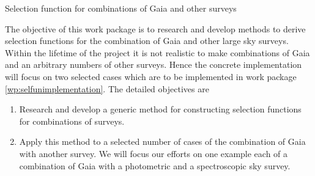 \begin{workpackage}{Selection function for combinations of Gaia and other surveys}
  \label{wp:selfuncombine}
  \wpend{\duration} %

  \makewptable %

  \begin{wpobjectives}
    The objective of this work package is to research and develop methods to derive selection functions for the combination of Gaia and other large sky surveys. Within the lifetime of the project it is not realistic to make combinations of Gaia and an arbitrary numbers of other surveys. Hence the concrete implementation will focus on two selected cases which are to be implemented in work package \ref{wp:selfunimplementation}. The detailed objectives are
    \begin{enumerate}
      \item Research and develop a generic method for constructing selection functions for combinations of surveys.
      \item Apply this method to a selected number of cases of the combination of Gaia with another survey. We will focus our efforts on one example each of a combination of Gaia with a photometric and a spectroscopic sky survey.
    \end{enumerate}
  \end{wpobjectives}

  \begin{wpdescription}
\end{wpdescription}
\end{workpackage}
